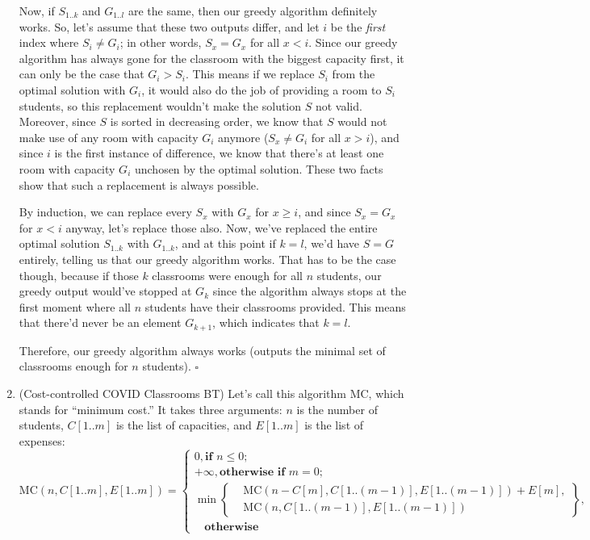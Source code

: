 \documentclass{article}
\begin{document}
\begin{enumerate}
    Now, if $S_{1..k}$ and $G_{1..l}$ are the same, then our greedy algorithm definitely works. So, let's assume that these two outputs differ, and let $i$ be the \textit{first} index where $S_i \ne G_i$; in other words, $S_x = G_x$ for all $x < i$. Since our greedy algorithm has always gone for the classroom with the biggest capacity first, it can only be the case that $G_i > S_i$. This means if we replace $S_i$ from the optimal solution with $G_i$, it would also do the job of providing a room to $S_i$ students, so this replacement wouldn't make the solution $S$ not valid. Moreover, since $S$ is sorted in decreasing order, we know that $S$ would not make use of any room with capacity $G_i$ anymore ($S_x \ne G_i$ for all $x > i$), and since $i$ is the first instance of difference, we know that there's at least one room with capacity $G_i$ unchosen by the optimal solution. These two facts show that such a replacement is always possible.

    By induction, we can replace every $S_x$ with $G_x$ for $x \ge i$, and since $S_x = G_x$ for $x < i$ anyway, let's replace those also. Now, we've replaced the entire optimal solution $S_{1..k}$ with $G_{1..k}$, and at this point if $k = l$, we'd have $S = G$ entirely, telling us that our greedy algorithm works. That has to be the case though, because if those $k$ classrooms were enough for all $n$ students, our greedy output would've stopped at $G_k$ since the algorithm always stops at the first moment where all $n$ students have their classrooms provided. This means that there'd never be an element $G_{k+1}$, which indicates that $k = l$.

    Therefore, our greedy algorithm always works (outputs the minimal set of classrooms enough for $n$ students). $\square$

    \pagebreak

  \item (Cost-controlled COVID Classrooms BT) Let's call this algorithm MC, which stands for ``minimum cost.'' It takes three arguments: $n$ is the number of students, $C[1..m]$ is the list of capacities, and $E[1..m]$ is the list of expenses:
    $$
      \text{MC}(n, C[1..m], E[1..m]) = \begin{cases}
        0, \textbf{if }n \le 0;                       \\
        +\infty, \textbf{otherwise if }m = 0;         \\
        \min\left\{\begin{aligned}
           & \text{MC}(n - C[m], C[1..(m-1)], E[1..(m-1)]) + E[m], \\
           & \text{MC}(n, C[1..(m-1)], E[1..(m-1)])
        \end{aligned}\right\}, \\
        \ \ \ \ \textbf{otherwise}
      \end{cases}
    $$


\end{enumerate}
\end{document}
